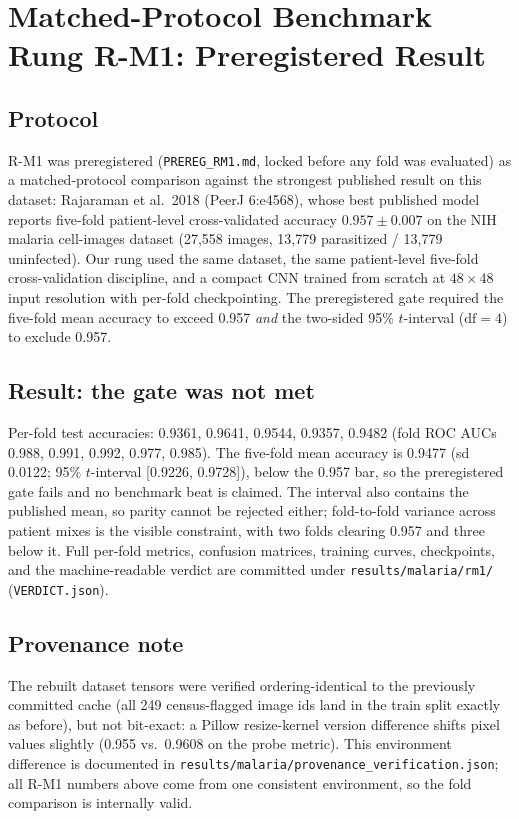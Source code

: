 \section{Matched-Protocol Benchmark Rung R-M1: Preregistered Result}
\label{sec:rm1}

\subsection{Protocol}
R-M1 was preregistered (\texttt{PREREG\_RM1.md}, locked before any fold was
evaluated) as a matched-protocol comparison against the strongest published
result on this dataset: Rajaraman et al.\ 2018 (PeerJ 6:e4568), whose best
published model reports five-fold patient-level cross-validated accuracy
$0.957 \pm 0.007$ on the NIH malaria cell-images dataset (27{,}558 images,
13{,}779 parasitized / 13{,}779 uninfected). Our rung used the same dataset,
the same patient-level five-fold cross-validation discipline, and a compact
CNN trained from scratch at $48\times48$ input resolution with per-fold
checkpointing. The preregistered gate required the five-fold mean accuracy
to exceed 0.957 \emph{and} the two-sided 95\% $t$-interval ($\mathrm{df}=4$)
to exclude 0.957.

\subsection{Result: the gate was not met}
Per-fold test accuracies: 0.9361, 0.9641, 0.9544, 0.9357, 0.9482
(fold ROC AUCs 0.988, 0.991, 0.992, 0.977, 0.985). The five-fold mean
accuracy is 0.9477 (sd 0.0122; 95\% $t$-interval [0.9226, 0.9728]), below
the 0.957 bar, so the preregistered gate fails and no benchmark beat is
claimed. The interval also contains the published mean, so parity cannot be
rejected either; fold-to-fold variance across patient mixes is the visible
constraint, with two folds clearing 0.957 and three below it. Full
per-fold metrics, confusion matrices, training curves, checkpoints, and the
machine-readable verdict are committed under
\texttt{results/malaria/rm1/} (\texttt{VERDICT.json}).

\subsection{Provenance note}
The rebuilt dataset tensors were verified ordering-identical to the
previously committed cache (all 249 census-flagged image ids land in the
train split exactly as before), but not bit-exact: a Pillow resize-kernel
version difference shifts pixel values slightly (0.955 vs.\ 0.9608 on the
probe metric). This environment difference is documented in
\texttt{results/malaria/provenance\_verification.json}; all R-M1 numbers
above come from one consistent environment, so the fold comparison is
internally valid.

